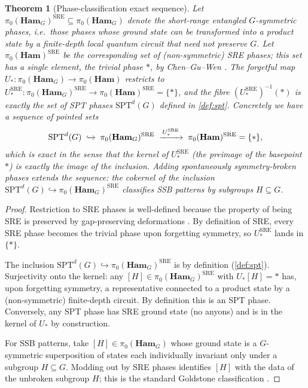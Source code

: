 \documentclass[12pt]{article}
\theoremstyle{plain}
\newtheorem{theorem}{Theorem}[section]
\theoremstyle{definition}
\theoremstyle{remark}
\newcommand{\Ham}{\mathbf{Ham}}
\begin{document}
\begin{theorem}[Phase-classification exact sequence]
\label{thm:phase-classification}
Let $\pi_{0}(\Ham_{G})^{\mathrm{SRE}}\subseteq\pi_{0}(\Ham_{G})$ denote the
\emph{short-range entangled} $G$-symmetric phases, i.e.\ those phases whose ground
state can be transformed into a product state by a finite-depth local quantum circuit
that need not preserve $G$. Let $\pi_{0}(\Ham)^{\mathrm{SRE}}$ be the corresponding set
of (non-symmetric) SRE phases; this set has a single element, the trivial phase
$\ast$, by Chen--Gu--Wen \cite{ChenGuLiuWen2013}. The forgetful map
$U_{*}:\pi_{0}(\Ham_{G})\to\pi_{0}(\Ham)$ restricts to
$U_{*}^{\mathrm{SRE}}:\pi_{0}(\Ham_{G})^{\mathrm{SRE}}\to\pi_{0}(\Ham)^{\mathrm{SRE}}=\{\ast\}$,
and the fibre $(U_{*}^{\mathrm{SRE}})^{-1}(\ast)$ is exactly the set of SPT phases
$\mathrm{SPT}^{d}(G)$ defined in \cref{def:spt}. Concretely we have a sequence of
pointed sets
\[
\mathrm{SPT}^{d}(G) \;\xhookrightarrow{}\; \pi_{0}(\Ham_{G})^{\mathrm{SRE}}
\;\xrightarrow{\,U_{*}^{\mathrm{SRE}}\,}\; \pi_{0}(\Ham)^{\mathrm{SRE}} = \{\ast\},
\]
which is exact in the sense that the kernel of $U_{*}^{\mathrm{SRE}}$ (the preimage of
the basepoint $\ast$) is exactly the image of the inclusion. Adding spontaneously
symmetry-broken phases extends the sequence: the cokernel of the inclusion
$\mathrm{SPT}^{d}(G)\hookrightarrow\pi_{0}(\Ham_{G})^{\mathrm{SRE}}$ classifies SSB
patterns by subgroups $H\subseteq G$.
\end{theorem}

\begin{proof}
Restriction to SRE phases is well-defined because the property of being SRE is preserved
by gap-preserving deformations \cite{ChenGuLiuWen2013}. By definition of SRE, every SRE
phase becomes the trivial phase upon forgetting symmetry, so
$U_{*}^{\mathrm{SRE}}$ lands in $\{\ast\}$.

The inclusion $\mathrm{SPT}^{d}(G)\hookrightarrow\pi_{0}(\Ham_{G})^{\mathrm{SRE}}$ is by
definition (\cref{def:spt}). Surjectivity onto the kernel: any
$[H]\in\pi_{0}(\Ham_{G})^{\mathrm{SRE}}$ with $U_{*}[H]=\ast$ has, upon forgetting
symmetry, a representative connected to a product state by a (non-symmetric) finite-depth
circuit. By definition this is an SPT phase. Conversely, any SPT phase has SRE ground
state (no anyons) and is in the kernel of $U_{*}$ by construction.

For SSB patterns, take $[H]\in\pi_{0}(\Ham_{G})$ whose ground state is a $G$-symmetric
superposition of states each individually invariant only under a subgroup $H\subseteq G$.
Modding out by SRE phases identifies $[H]$ with the data of the unbroken subgroup $H$;
this is the standard Goldstone classification \cite{LandauLifshitz1980}.
\end{proof}
\end{document}
